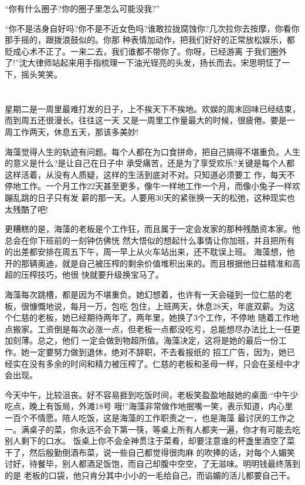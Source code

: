 \documentclass[11pt,a4paper,onecolumn]{article}
\begin{document}
``你有什么圈子?你的圈子里怎么可能没我?''

``你不是洁身自好吗?你不是不近女色吗?谁敢拉拢腐蚀你?几次拉你去按摩，你看你那手摇的，跟拨浪鼓似的。你那
种表情加动作，把我们好好的正常放松娱乐，都贬成心术不正了。一来二去，我们谁都不带你了。你呀，已经游离
于我们圈外了!''沈大律师站起来用手指梳理一下油光锃亮的头发，扬长而去。宋思明怔了一下，摇头笑笑。

\section[\thesection]{}


星期二是一周里最难打发的日子，上不挨天下不挨地。欢娱的周末回味已经结束，而到周五还很漫长。往往这一天
又是一周里工作量最大的时候，很疲倦。要是一周工作两天，休息五天，那该多美妙!

海藻觉得人生的轨迹有问题。每个人都在为口食拼命，把自己搞得不堪重负。人生的意义是什么?是让自己在日子中
承受痛苦，还是为了享受欢乐?关键是每个人都这样活着，从没有人质疑，这样的生活到底对不对。只知道必须要工
作，每天不停地工作。一个月工作22天甚至更多，像牛一样地工作一个月，而像小兔子一样欢蹦乱跳的日子只有发
薪的那一天。人要用30天的紧张换一天的松弛，这种现实也太残酷了吧!

更糟糕的是，海藻的老板是个工作狂，而且属于一定会发家的那种残酷资本家。他总会在你下班前的一刻钟仿佛恍
然大悟似的想起什么事情让你加班，并且把所有的出差都安排在周五下午，周一早上从火车站出来，还不耽误上班。
海藻想，他开的那辆奥迪，就是自己被压榨的剩余价值堆积出来的。而且根据他日益精准和高超的压榨技巧，他很
快就要升级换宝马了。

海藻每次跳槽，都是因为不堪重负。她幻想着，也许有一天会碰到一位仁慈的老板，很慷慨地说，每月一万，包吃
包住，上班两天，休息28天，年底双薪。为这个仁慈的老板，她已经期待两年了，两年里，她换了3个工作，不停地
随着工作地点搬家。工资倒是每次必涨一点，但老板一点都没吃亏，总能想尽办法比上一任更加刻薄。总之，他们
一定会做到物超所值。海藻决定，这将是她的最后一份工作。她一定要努力做到退休，绝对不辞职，不去看报纸的
招工广告，因为，她已经实在没有多余的时间和精力被压榨了。仁慈的老板和圣母一样，只会在圣经中才会出现。

今天中午，比较沮丧。好不容易捱到吃饭时间，老板笑盈盈地敲她的桌面:``中午少吃点，晚上有饭局，外滩18号
哦!''海藻非常做作地抿嘴一笑，表示知道，内心里一百个不情愿。陪人吃饭，这是海藻的工作职责之一，也是海藻
最讨厌的工作之一。满桌子的菜，你永远不会下第一筷，等桌上所有人都夹一遍，你才有可能去吃别人剩下的口水。
饭桌上你不会全神贯注于菜肴，却要注意谁的杯盏里酒空了菜干了，然后殷勤倒酒布菜，说一些自己都觉得很肉麻
的吹捧的话，对每个人媚笑讨好，待餐毕，别人都酒足饭饱，而自己却腹中空空，了无滋味。明明钱最终落到的是
老板的口袋，他只肯分其中小小的一毛给自己，而谄媚的活儿都要自己干。
\end{document}
